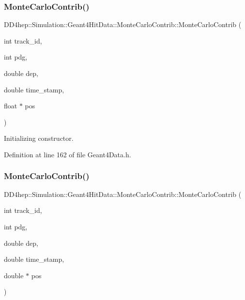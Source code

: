 \subsubsection{\texorpdfstring{Monte\+Carlo\+Contrib()}{MonteCarloContrib()}\hspace{0.1cm}{\footnotesize\ttfamily [3/5]}}
{\footnotesize\ttfamily D\+D4hep\+::\+Simulation\+::\+Geant4\+Hit\+Data\+::\+Monte\+Carlo\+Contrib\+::\+Monte\+Carlo\+Contrib (\begin{DoxyParamCaption}\item[{int}]{track\+\_\+id,  }\item[{int}]{pdg,  }\item[{double}]{dep,  }\item[{double}]{time\+\_\+stamp,  }\item[{float $\ast$}]{pos }\end{DoxyParamCaption})\hspace{0.3cm}{\ttfamily [inline]}}



Initializing constructor. 



Definition at line 162 of file Geant4\+Data.\+h.

\hypertarget{class_d_d4hep_1_1_simulation_1_1_geant4_hit_data_1_1_monte_carlo_contrib_ac8d6f1ef4bbb713c2f7a1ee10230450e}{}\label{class_d_d4hep_1_1_simulation_1_1_geant4_hit_data_1_1_monte_carlo_contrib_ac8d6f1ef4bbb713c2f7a1ee10230450e} 
\subsubsection{\texorpdfstring{Monte\+Carlo\+Contrib()}{MonteCarloContrib()}\hspace{0.1cm}{\footnotesize\ttfamily [4/5]}}
{\footnotesize\ttfamily D\+D4hep\+::\+Simulation\+::\+Geant4\+Hit\+Data\+::\+Monte\+Carlo\+Contrib\+::\+Monte\+Carlo\+Contrib (\begin{DoxyParamCaption}\item[{int}]{track\+\_\+id,  }\item[{int}]{pdg,  }\item[{double}]{dep,  }\item[{double}]{time\+\_\+stamp,  }\item[{double $\ast$}]{pos }\end{DoxyParamCaption})\hspace{0.3cm}{\ttfamily [inline]}}



